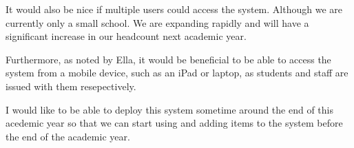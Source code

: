 \documentclass[../../../main.tex]{subfiles}
\begin{document}
It would also be nice if multiple users could access the system.
Although we are currently only a small school. We are expanding rapidly and will have a significant increase in our headcount next academic year.

Furthermore, as noted by Ella, it would be beneficial to be able to access the system from a mobile device, such as an iPad or laptop, as students and staff are issued with them resepectively.

I would like to be able to deploy this system sometime around the end of this acedemic year so that we can start using and adding items to the system before the end of the academic year.
\end{document}
